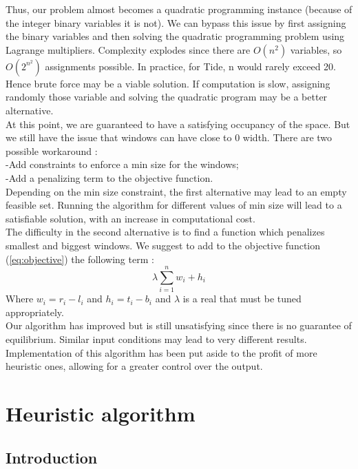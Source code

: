 \documentclass{acmtog}
\begin{document}
Thus, our problem almost becomes a quadratic programming instance (because of the integer binary variables it is not).
We can bypass this issue by first assigning the binary variables and then solving the quadratic programming problem using Lagrange multipliers.  %
Complexity explodes since there are $O(n^2)$ variables, so $O(2^{n^2})$ assignments possible. In practice, for Tide, n would rarely exceed 20. Hence brute force may be a viable solution. If computation is slow, assigning randomly those variable and solving the quadratic program may be a better alternative. \\
At this point, we are guaranteed to have a satisfying occupancy of the space. But we still have the issue that windows can have close to 0 width. There are two possible workaround : \\
-Add constraints to enforce a min size for the windows; \\%
-Add a penalizing term to the objective function. \\
Depending on the min size constraint, the first alternative  may lead to an empty feasible set. Running the algorithm for different values of min size will lead to a satisfiable solution, with an increase in computational cost. \\
The difficulty in the second alternative is to find a function which penalizes smallest and biggest windows. We suggest to add to the objective function (\ref{eq:objective}) the following term :
\begin{equation}
\lambda \sum_{i = 1}^{n}{w_i + h_i}
\end{equation}
 Where $w_i = r_i - l_i$ and $h_i = t_i - b_i$ and $\lambda$ is a real that must be tuned appropriately. \\
Our algorithm has improved but is still unsatisfying since there is no guarantee of equilibrium. %
Similar input conditions may lead to very different results. Implementation of this algorithm has been put aside to the profit of more heuristic ones, allowing for a greater control over the output.


\section{Heuristic algorithm}

\subsection{Introduction}
\end{document}
